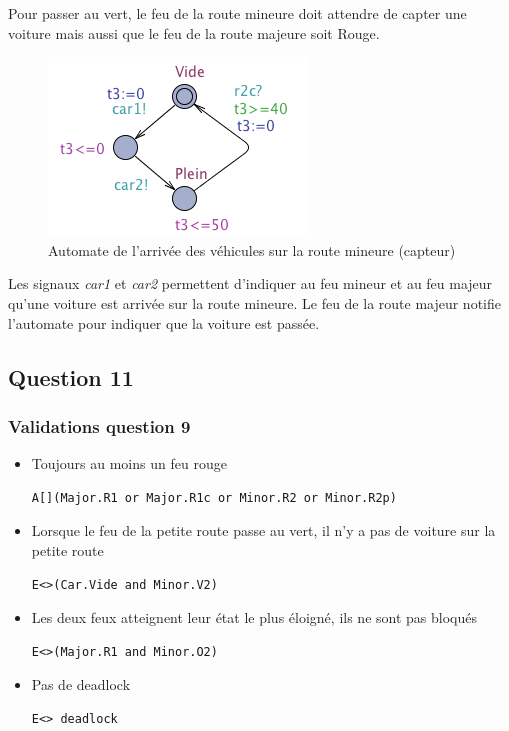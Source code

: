 \documentclass[11pt]{article}
\begin{document}
Pour passer au vert, le feu de la route mineure doit attendre de capter une voiture mais aussi que le feu de la route majeure soit Rouge.

\begin{figure}[H]
	\centering
	\includegraphics{ressources/part3/Q10-3.png}
	\caption{Automate de l'arrivée des véhicules sur la route mineure (capteur)}
\end{figure}

Les signaux \emph{car1} et \emph{car2} permettent d'indiquer au feu mineur et au feu majeur qu'une voiture est arrivée sur la route mineure. Le feu de la route majeur notifie l'automate pour indiquer que la voiture est passée.

\subsection{Question 11}

\subsubsection{Validations question 9}

\begin{itemize}
	\item Toujours au moins un feu rouge
\begin{verbatim}
A[](Major.R1 or Major.R1c or Minor.R2 or Minor.R2p)
\end{verbatim}
	
	\item Lorsque le feu de la petite route passe au vert, il n'y a pas de voiture sur la petite route
\begin{verbatim}
E<>(Car.Vide and Minor.V2)
\end{verbatim}
	
	\item Les deux feux atteignent leur état le plus éloigné, ils ne sont pas bloqués
\begin{verbatim}
E<>(Major.R1 and Minor.O2)
\end{verbatim}
	
	\item Pas de deadlock
\begin{verbatim}
E<> deadlock
\end{verbatim}

\end{itemize}
\end{document}
